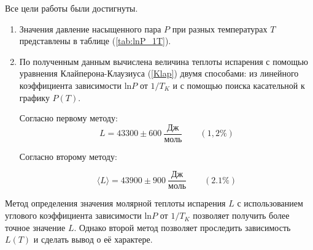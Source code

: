 \documentclass[a4paper,12pt]{article} %
\begin{document}
Все цели работы были достигнуты. 

\begin{enumerate}
  \item Значения давление насыщенного пара $P$ при разных температурах $T$ представлены в таблице (\ref{tab:lnP_1T}). 
  \item По полученным данным вычислена величина теплоты испарения с помощью уравнения Клайперона-Клаузиуса (\ref{Klap}) 
  двумя способами: из линейного коэффициента зависимости $\mbox{ln}P$ от $1/T_K$ и с помощью поиска касательной к графику $P(T)$. 
  
  Согласно первому методу:
  \begin{equation}
    L = 43300 \pm 600\ \frac{\mbox{Дж}}{\mbox{моль}} \qquad (1,2\%) 
  \end{equation}

  Согласно второму методу:
  
  \begin{equation}
    \langle L \rangle = 43900 \pm 900\ \frac{\mbox{Дж}}{\mbox{моль}} \qquad (2.1 \%) 
  \end{equation}
\end{enumerate}

Метод определения значения молярной теплоты испарения $L$ с использованием углового коэффициента зависимости $\mbox{ln}P$ от $1/T_K$ позволяет получить более точное значение $L$. 
Однако второй метод позволяет проследить зависимость $L(T)$ и сделать вывод о её характере.
\end{document}

